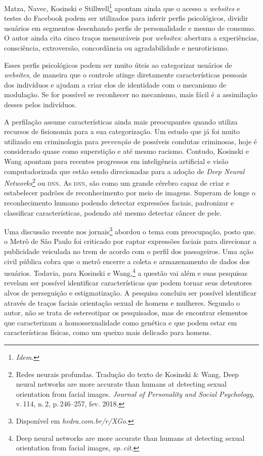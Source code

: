 Matza, Navec, Kosinski e Stillwell\footnote{\textit{Idem}.} apontam ainda que o acesso a
\textit{websites} e testes do Facebook podem ser utilizados para inferir perfis
psicológicos, dividir usuários em segmentos desenhando perfis de
personalidade e mesmo de consumo. O autor ainda cita cinco traços
mensuráveis por \textit{websites}: abertura a experiências, consciência, extroversão, concordância ou agradabilidade e neuroticismo.

Esses perfis psicológicos podem ser muito úteis ao categorizar usuários
de \textit{websites}, de maneira que o controle atinge diretamente
características pessoais dos indivíduos e ajudam a criar elos de
identidade com o mecanismo de modulação. Se for possível se reconhecer
no mecanismo, mais fácil é a assimilação desses pelos indivíduos.

A perfilação assume características ainda mais preocupantes quando
utiliza recursos de fisionomia para a sua categorização. Um estudo que
já foi muito utilizado em criminologia para \textit{prevenção} de possíveis
condutas criminosas, hoje é considerado quase como superstição e até
mesmo racismo. Contudo, Kosinski e Wang apontam para recentes
progressos em inteligência artificial e visão computadorizada que estão
sendo direcionadas para a adoção de \textit{Deep Neural
Networks}\footnote{Redes neurais profundas. Tradução do texto de
  Kosinski \& Wang, Deep neural networks are more
accurate than humans at detecting sexual orientation from facial
images. \textit{Journal of Personality and Social Psychology}, v.\,114, n.\,2, p.\,246--257, fev. 2018.} ou \textsc{dnn}. As \textsc{dnn}, são como um
grande cérebro capaz de criar e estabelecer padrões de reconhecimento
por meio de imagens. Superam de longe o reconhecimento humano podendo
detectar expressões faciais, padronizar e classificar características,
podendo até mesmo detectar câncer de pele.

Uma discussão recente nos jornais\footnote{Disponível em \textit{hedra.com.br/r/XGo}.} abordou o tema com preocupação, posto que.
o Metrô de São Paulo foi criticado por captar expressões faciais para
direcionar a publicidade veiculada no trem de acordo com o perfil dos
passageiros. Uma ação civil pública cobra que o metrô encerre a coleta e
armazenamento de dados dos usuários. Todavia, para Kosinski e Wang,\footnote{Deep neural networks are more accurate than humans at detecting sexual orientation from facial
images, \textit{op.\,cit.}}
a questão vai além e suas pesquisas revelam ser possível identificar
características que podem tornar seus detentores alvos de perseguição e
estigmatização. A pesquisa concluiu ser possível identificar através de
traços faciais orientação sexual de homens e mulheres. Segundo o autor,
não se trata de estereotipar os pesquisados, mas de encontrar elementos
que caracterizam a homossexualidade como genética e que podem estar em
características físicas, como um queixo mais delicado para homens.

